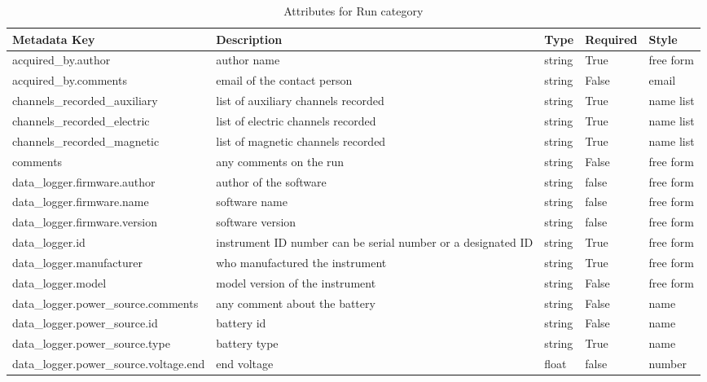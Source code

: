\documentclass{article}
\begin{document}
\begin{table}[htb!]
    \caption[Attributes for Run]{Attributes for Run category}
    \begin{tabular}{|l|p{2.75in}|l|l|p{.95in}|}
        \hline
       \textbf{Metadata Key} & \textbf{Description} & \textbf{Type} & \textbf{Required} & \textbf{Style}\\ \hline acquired\_by.author & author name & string & True & free form  \\ \hline
       acquired\_by.comments & email of the contact person & string & False & email  \\ \hline
       channels\_recorded\_auxiliary & list of auxiliary channels recorded & string & True & name list  \\ \hline
       channels\_recorded\_electric & list of electric channels recorded & string & True & name list  \\ \hline
       channels\_recorded\_magnetic & list of magnetic channels recorded & string & True & name list  \\ \hline
       comments & any comments on the run & string & False & free form  \\ \hline
       data\_logger.firmware.author & author of the software & string & false & free form  \\ \hline
       data\_logger.firmware.name & software name & string & false & free form  \\ \hline
       data\_logger.firmware.version & software version & string & false & free form  \\ \hline
       data\_logger.id & instrument ID number can be serial number or a designated ID & string & True & free form  \\ \hline
       data\_logger.manufacturer & who manufactured the instrument & string & True & free form  \\ \hline
       data\_logger.model & model version of the instrument & string & False & free form  \\ \hline
       data\_logger.power\_source.comments & any comment about the battery & string & False & name  \\ \hline
       data\_logger.power\_source.id & battery id & string & False & name  \\ \hline
       data\_logger.power\_source.type & battery type & string & True & name  \\ \hline
       data\_logger.power\_source.voltage.end & end voltage & float & false & number  \\ \hline

\end{tabular}
\end{table}
\end{document}
